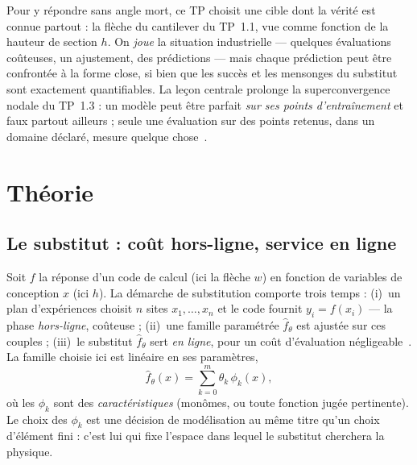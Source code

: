 \documentclass[10pt,journal]{IEEEtran}
\begin{document}
Pour y répondre sans angle mort, ce TP choisit une cible dont la vérité est connue partout : la flèche du cantilever du TP~1.1, vue comme fonction de la hauteur de section $h$. On \emph{joue} la situation industrielle --- quelques évaluations coûteuses, un ajustement, des prédictions --- mais chaque prédiction peut être confrontée à la forme close, si bien que les succès et les mensonges du substitut sont exactement quantifiables. La leçon centrale prolonge la superconvergence nodale du TP~1.3 : un modèle peut être parfait \emph{sur ses points d'entraînement} et faux partout ailleurs ; seule une évaluation sur des points retenus, dans un domaine déclaré, mesure quelque chose~\cite{hastie}.

\section{Théorie}
\subsection{Le substitut : coût hors-ligne, service en ligne}
Soit $f$ la réponse d'un code de calcul (ici la flèche $w$) en fonction de variables de conception $x$ (ici $h$). La démarche de substitution comporte trois temps : (i)~un plan d'expériences choisit $n$ sites $x_1,\dots,x_n$ et le code fournit $y_i = f(x_i)$ --- la phase \emph{hors-ligne}, coûteuse ; (ii)~une famille paramétrée $\hat f_\theta$ est ajustée sur ces couples ; (iii)~le substitut $\hat f_\theta$ sert \emph{en ligne}, pour un coût d'évaluation négligeable~\cite{forrester}. La famille choisie ici est linéaire en ses paramètres,
\begin{equation}
\hat f_\theta(x) = \sum_{k=0}^{m} \theta_k\,\phi_k(x),
\label{eq:famille}
\end{equation}
où les $\phi_k$ sont des \emph{caractéristiques} (monômes, ou toute fonction jugée pertinente). Le choix des $\phi_k$ est une décision de modélisation au même titre qu'un choix d'élément fini : c'est lui qui fixe l'espace dans lequel le substitut cherchera la physique.
\end{document}
